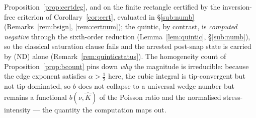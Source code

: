 \begin{enumerate}
          Proposition~\ref{prop:certdeg}, and on the finite rectangle certified by the inversion-free criterion of
          Corollary~\ref{cor:cert}, evaluated in \S\ref{sub:numb} (Remarks~\ref{rem:bsign}, \ref{rem:certnum}); the
          quintic, by contrast, is \emph{computed negative} through the sixth-order reduction
          (Lemma~\ref{lem:quintic}, \S\ref{sub:numb}), so the classical saturation clause fails and the arrested
          post-snap state is carried by (ND) alone (Remark~\ref{rem:quinticstatus}). The
          homogeneity count of Proposition~\ref{prop:bcount} pins down \emph{why} the magnitude is irreducible:
          because the edge exponent satisfies $\alpha>\tfrac12$ here, the cubic integral is tip-convergent but not
          tip-dominated, so $b$ does not collapse to a universal wedge number but remains a functional $b(\nu,\hat K)$
          of the Poisson ratio and the normalised stress-intensity --- the quantity the computation maps out.
\end{enumerate}

